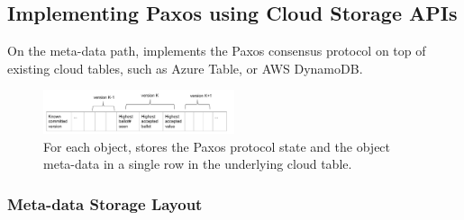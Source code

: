 %



\subsection{Implementing Paxos using Cloud Storage APIs}

On the meta-data path, \name implements the Paxos consensus protocol on top of existing cloud tables,
such as Azure Table, or AWS DynamoDB.

\begin{figure}[tp]
\centering
\includegraphics[width=0.5\textwidth]{fig/Giza_Metadata}
\caption{For each object, \name stores the Paxos protocol state and the object meta-data 
in a single row in the underlying cloud table.\label{fig:metadata}}
\end{figure}

\subsubsection{Meta-data Storage Layout}

